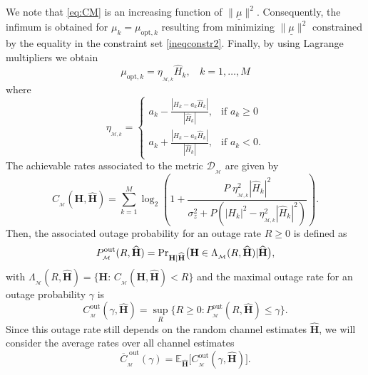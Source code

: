 \documentclass{article}
\begin{document}
We note that \eqref{eq:CM} is an increasing function of $\|\underline{\mu}\|^2$. Consequently, the infimum is obtained for $\mu_k=\mu_{\mathrm{opt},k}$ resulting from minimizing $\|\underline{\mu}\|^2$ constrained by the equality in the constraint set \eqref{ineqconstr2}. Finally, by using Lagrange multipliers we obtain
\begin{equation}
\mu_{\mathrm{opt},k} = \eta_{_{\mathcal{M},k}} \widehat{H}_k, \,\;\;\,k=1,\dots,M
\end{equation}
where 
\begin{equation}
\eta_{_{\mathcal{M},k}} =\left\{ \begin{array}{ll} a_k-\displaystyle{\frac{|H_k-a_k\widehat{H}_k|}{|\widehat{H}_k|}}, & \mathrm{if}\,\, a_k \geq 0\\
 a_k+\displaystyle{\frac{|H_k-a_k\widehat{H}_k|}{|\widehat{H}_k|}}, & \mathrm{if}\,\, a_k < 0. 
\end{array} \right.
\end{equation}
The achievable rates associated to the metric $\mathcal{D}_{_\mathcal{M}}$ are given by
\begin{equation}
C_{_\mathcal{M}}(\mathbf{H},\widehat{\mathbf{H}})=\sum\limits_{k=1}^M\log_2\left(1+\frac{P\; \eta_{_{\mathcal{M},k}}^2|\widehat{H}_k|^2}{\sigma^2_z + P(|H_k|^2-\eta_{_{\mathcal{M},k}}^2|\widehat{H}_k|^2)}\right).
\end{equation}  
Then, the associated outage probability for an outage rate $R \geq 0$ is defined as
\begin{equation}
P_{_{\mathcal{M}}}^{\mathrm{out}}(R,\widehat{\mathbf{H}})=\mathrm{Pr}_{\mathbf{H}| \widehat{\mathbf{H}}} \big(\mathbf{H}\in \Lambda_{_\mathcal{M}}(R,\widehat{\mathbf{H}})|\widehat{\mathbf{H}}\big), \notag
\end{equation}
with $\Lambda_{_\mathcal{M}}(R,\widehat{\mathbf{H}})=\big\{\mathbf{H}:\, C_{_\mathcal{M}}(\mathbf{H},\widehat{\mathbf{H}})<R\big\}$ and the maximal outage rate for an outage probability $\gamma$ is
\begin{equation}
\label{capout}
C_{_\mathcal{M}}^{\mathrm{out}}(\gamma,\widehat{\mathbf{H}})=\sup_R\big\{R \geq 0: P_{_{\mathcal{M}}}^{\mathrm{out}}(R,\widehat{\mathbf{H}})\leq \gamma\big\}. 
\end{equation}
Since this outage rate still depends on the random channel estimates $\widehat{\mathbf{H}}$, we will consider the average rates over all channel estimates
\begin{equation}
\overline{C}_{_\mathcal{M}}^{\; \mathrm{out}}(\gamma)=\mathbb{E}_{\widehat{\mathbf{H}}}\big[C_{_\mathcal{M}}^{\mathrm{out}}(\gamma,\widehat{\mathbf{H}})\big]. \label{EQ-capacity}
\end{equation}
\end{document}
